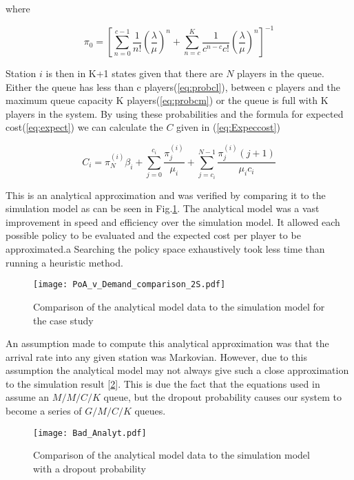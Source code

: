 \documentclass[12pt]{article}
\begin{document}
where

\begin{equation}
\pi_{0} = \left[ \sum_{n=0}^{c-1} \frac{1}{n!} \left( \frac{\lambda}{\mu} \right)^{n}  + \sum_{n=c}^{K} \frac{1}{c^{n-c}c!} \left( \frac{\lambda}{\mu} \right)^{n} \right] ^{-1}
\end{equation}

Station $i$ is then in K+1 states given that there are $N$ players in the queue. Either the queue has less than c players(\ref{eq:probcl}), between c players and the maximum queue capacity K players(\ref{eq:probcm}) or the queue is full with K players in the system. By using these probabilities and the formula for expected cost(\ref{eq:expect}) we can calculate the $C$ given in (\ref{eq:Expeccost})

\begin{equation}\label{stationcost}
C_{i} = \pi_{N}^{(i)} \beta_{i} + \sum_{j=0}^{c_{i}} \frac{\pi_{j}^{(i)}}{\mu_{i}} + \sum_{j=c_{i}}^{N-1}\frac{ \pi_{j}^{(i)}(j+1)}{ \mu_{i} c_{i}}
\end{equation}

This is an analytical approximation and was verified by comparing it to the simulation model as can be seen in Fig.\ref{fig:Ana_comp}. The analytical model was a vast improvement in speed and efficiency over the simulation model. It allowed each possible policy to be evaluated and the expected cost per player to be approximated.a Searching the policy space exhaustively took less time than running a heuristic method.


\begin{figure}[ht]
    \begin{center}

		\texttt{[image: PoA\_v\_Demand\_comparison\_2S.pdf]}
		\caption{Comparison of the analytical model data to the simulation model for the case study}
		\label{fig:Ana_comp}
    \end{center}
\end{figure}


An assumption made to compute this analytical approximation was that the arrival rate into any given station was Markovian. However, due to this assumption the analytical model may not always give such a close approximation to the simulation result [\ref{fig:Bad_Analyt}]. This is due the fact that the equations used in \cite{cite018} assume an $M/M/C/K$ queue, but the dropout probability causes our system to become a series of $G/M/C/K$ queues.


\begin{figure}[ht]
    \begin{center}

		\texttt{[image: Bad\_Analyt.pdf]}
		\caption{Comparison of the analytical model data to the simulation model with a dropout probability}
		\label{fig:Bad_Analyt}
    \end{center}
\end{figure}
\end{document}
